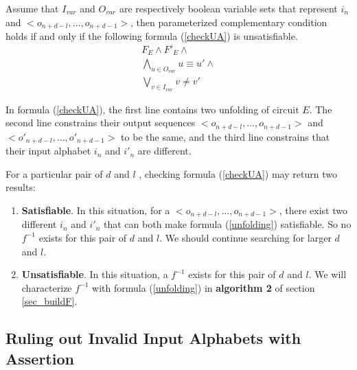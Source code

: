 \documentclass[journal]{IEEEtran}
\begin{document}
Assume that $I_{var}$ and $O_{var}$ are respectively boolean variable sets that represent $i_n$ and $<o_{n+d-l},\dots , o_{n+d-1} >$,
then parameterized complementary condition holds if and only if the following formula (\ref{checkUA}) is unsatisfiable.
\begin{equation}\label{checkUA}
\begin{array}{c}
F_E \wedge F'_E\wedge \\
\bigwedge_{u\in O_{var}} u\equiv u'\wedge \\
\bigvee_{v\in I_{var}} v\ne v'
\end{array}
\end{equation}

In formula (\ref{checkUA}),
the first line contains two unfolding of circuit $E$.
The second line constrains their output sequences $<o_{n+d-l},\dots , o_{n+d-1} >$ and $<o'_{n+d-l},\dots , o'_{n+d-1} >$ to be the same,
and the third line constrains that their input alphabet $i_n$ and $i'_n$ are different.

For a particular pair of $d$ and $l$ , checking formula (\ref{checkUA}) may return two results:
\begin{enumerate}
\item \textbf{Satisfiable}. In this situation,
      for a $<o_{n+d-l},\dots , o_{n+d-1} >$,
      there exist two different $i_n$ and $i'_n$ that can both make formula (\ref{unfolding}) satisfiable.
      So no $f^{-1}$ exists for this pair of $d$ and $l$.
      We should continue searching for larger $d$ and $l$.
\item \textbf{Unsatisfiable}. In this situation,
      a $f^{-1}$ exists for this pair of $d$ and $l$.
      We will characterize $f^{-1}$ with formula (\ref{unfolding}) in \textbf{algorithm 2} of section \ref{sec_buildF}.
\end{enumerate}


\subsection{Ruling out Invalid Input Alphabets with Assertion}\label{subsec_AST}
\end{document}
